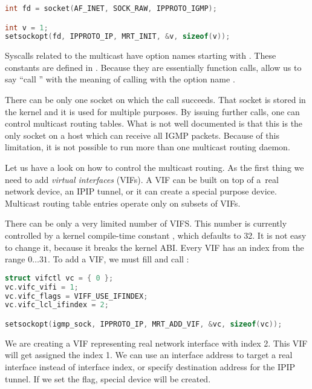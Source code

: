 \begin{lstlisting}[language=c]
int fd = socket(AF_INET, SOCK_RAW, IPPROTO_IGMP);

int v = 1;
setsockopt(fd, IPPROTO_IP, MRT_INIT, &v, sizeof(v));
\end{lstlisting}

\noindent Syscalls  related to the multicast have option names starting
with . These constants are defined in .
Because they are essentially function calls, allow us to say ``call
'' with the meaning of calling \setsockopt with the option
name .

There can be only one socket on which the call  succeeds. That socket
is stored in the kernel and it is used for multiple purposes. By issuing further
\setsockopt calls, one can control multicast routing tables. What is not well
documented is that this is the only socket on a host which can receive all IGMP
packets. Because of this limitation, it is not possible to run more than one
multicast routing daemon.

Let us have a look on how to control the multicast routing. As the first thing
we need to add \emph{virtual interfaces} (VIFs). A VIF can be built on top of
a~real network device, an IPIP tunnel, or it can create a special purpose device.
Multicast routing table entries operate only on subsets of VIFs.

There can be only a very limited number of VIFS. This number is currently
controlled by a kernel compile-time constant , which defaults to 32. It is not easy
to change it, because it breaks the kernel ABI. Every VIF has an index from the
range $0\dots31$. To add a VIF, we must fill  and call
:

\begin{lstlisting}[language=c]
struct vifctl vc = { 0 };
vc.vifc_vifi = 1;
vc.vifc_flags = VIFF_USE_IFINDEX;
vc.vifc_lcl_ifindex = 2;

setsockopt(igmp_sock, IPPROTO_IP, MRT_ADD_VIF, &vc, sizeof(vc));
\end{lstlisting}

\noindent We are creating a VIF representing real network interface with index 2. This VIF will
get assigned the index 1. We can use an interface address to target a real
interface instead of interface index, or specify destination address for the
IPIP tunnel. If we set the  flag, special device will be created.

